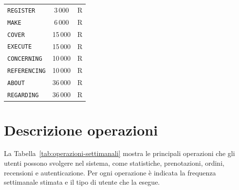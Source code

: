 \documentclass[a4paper,12pt]{report}
\begin{document}
\begin{table}[H]
\begin{tabularx}{\textwidth}{|X|c|c|}
    \texttt{REGISTER}            & 3\,000   & R \\
    \texttt{MAKE}                & 6\,000   & R \\
    \texttt{COVER}               & 15\,000  & R \\
    \texttt{EXECUTE}             & 15\,000  & R \\
    \texttt{CONCERNING}          & 10\,000  & R \\
    \texttt{REFERENCING}         & 10\,000  & R \\
    \texttt{ABOUT}               & 36\,000  & R \\
    \texttt{REGARDING}           & 36\,000  & R \\
    \hline
  \end{tabularx}
  \label{tab:volume-dati}
\end{table}

\section{Descrizione operazioni}
La Tabella~\ref{tab:operazioni-settimanali} mostra le principali
operazioni che gli utenti possono svolgere nel sistema, come
statistiche, prenotazioni, ordini, recensioni e autenticazione. Per
ogni operazione è indicata la frequenza settimanale stimata e il tipo
di utente che la esegue.
\end{document}
